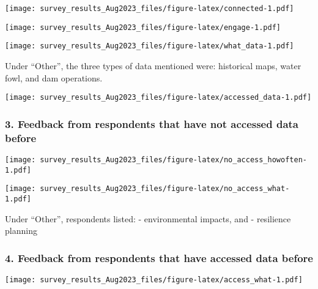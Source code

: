 \documentclass[
]{article}
\begin{document}
\texttt{[image: survey\_results\_Aug2023\_files/figure-latex/connected-1.pdf]}

\texttt{[image: survey\_results\_Aug2023\_files/figure-latex/engage-1.pdf]}

\texttt{[image: survey\_results\_Aug2023\_files/figure-latex/what\_data-1.pdf]}

Under ``Other'', the three types of data mentioned were: historical
maps, water fowl, and dam operations.

\texttt{[image: survey\_results\_Aug2023\_files/figure-latex/accessed\_data-1.pdf]}

\hypertarget{feedback-from-respondents-that-have-not-accessed-data-before}{%
\subsubsection{3. Feedback from respondents that have not accessed data
before}\label{feedback-from-respondents-that-have-not-accessed-data-before}}

\texttt{[image: survey\_results\_Aug2023\_files/figure-latex/no\_access\_howoften-1.pdf]}

\texttt{[image: survey\_results\_Aug2023\_files/figure-latex/no\_access\_what-1.pdf]}

Under ``Other'', respondents listed: - environmental impacts, and -
resilience planning

\hypertarget{feedback-from-respondents-that-have-accessed-data-before}{%
\subsubsection{4. Feedback from respondents that have accessed data
before}\label{feedback-from-respondents-that-have-accessed-data-before}}

\texttt{[image: survey\_results\_Aug2023\_files/figure-latex/access\_what-1.pdf]}
\end{document}
